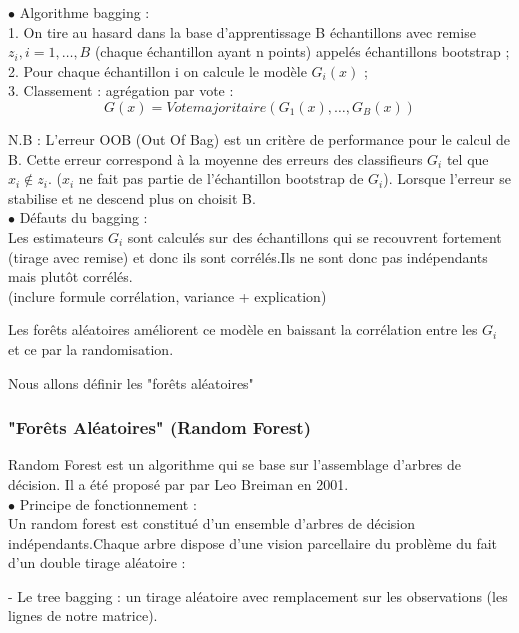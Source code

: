\documentclass[11pt]{article}
\begin{document}
$\bullet$ Algorithme bagging : \\

1. On tire au hasard dans la base d’apprentissage B échantillons avec remise $z_{i},i=1,…,B$ (chaque échantillon ayant n points)  appelés échantillons bootstrap ;\\

2. Pour chaque échantillon i on calcule le modèle $G_{i}(x)$ ;\\

3. Classement : agrégation par vote : 
$$G(x)=Votemajoritaire(G_{1}(x),…,G_{B}(x))$$

N.B : L'erreur OOB (Out Of Bag) est un critère de performance pour le calcul de B. Cette erreur correspond à la moyenne des erreurs des classifieurs $G_{i}$ tel que $x_{i} \notin	z_{i}$. ($x_{i}$ ne fait pas partie de l'échantillon bootstrap de $G_{i}$). Lorsque l'erreur se stabilise et ne descend plus on choisit B.\\

$\bullet$ Défauts du bagging : \\

Les estimateurs $G_{i}$ sont calculés sur des échantillons qui se recouvrent fortement (tirage avec remise) et donc ils sont corrélés.Ils ne sont donc pas indépendants mais plutôt corrélés.\\

(inclure formule corrélation, variance + explication)

Les forêts aléatoires améliorent ce modèle en baissant la corrélation entre les $G_{i}$ et ce par la randomisation.

Nous allons définir les "forêts aléatoires"

\subsubsection{ "Forêts Aléatoires" (Random Forest)}

Random Forest est un algorithme qui se base sur l’assemblage d’arbres de décision. Il a été proposé par par Leo Breiman en 2001.\\


$\bullet$ Principe de fonctionnement : \\
Un random forest est constitué d'un ensemble d'arbres de décision indépendants.Chaque arbre dispose d'une vision parcellaire du problème du fait d'un double tirage aléatoire :

- Le tree bagging : un tirage aléatoire avec remplacement sur les observations (les lignes de notre matrice). 
\end{document}
